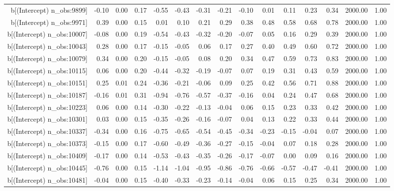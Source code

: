 \begin{table}[ht]
\begin{tabular}{rrrrrrrrrrrrrrr}
  b[(Intercept) n\_obs:9899] & -0.10 & 0.00 & 0.17 & -0.55 & -0.43 & -0.31 & -0.21 & -0.10 & 0.01 & 0.11 & 0.23 & 0.34 & 2000.00 & 1.00 \\ 
  b[(Intercept) n\_obs:9971] & 0.39 & 0.00 & 0.15 & 0.01 & 0.10 & 0.21 & 0.29 & 0.38 & 0.48 & 0.58 & 0.68 & 0.78 & 2000.00 & 1.00 \\ 
  b[(Intercept) n\_obs:10007] & -0.08 & 0.00 & 0.19 & -0.54 & -0.43 & -0.32 & -0.20 & -0.07 & 0.05 & 0.16 & 0.29 & 0.39 & 2000.00 & 1.00 \\ 
  b[(Intercept) n\_obs:10043] & 0.28 & 0.00 & 0.17 & -0.15 & -0.05 & 0.06 & 0.17 & 0.27 & 0.40 & 0.49 & 0.60 & 0.72 & 2000.00 & 1.00 \\ 
  b[(Intercept) n\_obs:10079] & 0.34 & 0.00 & 0.20 & -0.15 & -0.05 & 0.08 & 0.20 & 0.34 & 0.47 & 0.59 & 0.73 & 0.83 & 2000.00 & 1.00 \\ 
  b[(Intercept) n\_obs:10115] & 0.06 & 0.00 & 0.20 & -0.44 & -0.32 & -0.19 & -0.07 & 0.07 & 0.19 & 0.31 & 0.43 & 0.59 & 2000.00 & 1.00 \\ 
  b[(Intercept) n\_obs:10151] & 0.25 & 0.01 & 0.24 & -0.36 & -0.21 & -0.06 & 0.09 & 0.25 & 0.42 & 0.56 & 0.71 & 0.88 & 2000.00 & 1.00 \\ 
  b[(Intercept) n\_obs:10187] & -0.16 & 0.01 & 0.31 & -0.94 & -0.76 & -0.57 & -0.37 & -0.16 & 0.04 & 0.24 & 0.47 & 0.68 & 2000.00 & 1.00 \\ 
  b[(Intercept) n\_obs:10223] & 0.06 & 0.00 & 0.14 & -0.30 & -0.22 & -0.13 & -0.04 & 0.06 & 0.15 & 0.23 & 0.33 & 0.42 & 2000.00 & 1.00 \\ 
  b[(Intercept) n\_obs:10301] & 0.03 & 0.00 & 0.15 & -0.35 & -0.26 & -0.16 & -0.07 & 0.04 & 0.13 & 0.22 & 0.33 & 0.44 & 2000.00 & 1.00 \\ 
  b[(Intercept) n\_obs:10337] & -0.34 & 0.00 & 0.16 & -0.75 & -0.65 & -0.54 & -0.45 & -0.34 & -0.23 & -0.15 & -0.04 & 0.07 & 2000.00 & 1.00 \\ 
  b[(Intercept) n\_obs:10373] & -0.15 & 0.00 & 0.17 & -0.60 & -0.49 & -0.36 & -0.27 & -0.15 & -0.04 & 0.07 & 0.18 & 0.28 & 2000.00 & 1.00 \\ 
  b[(Intercept) n\_obs:10409] & -0.17 & 0.00 & 0.14 & -0.53 & -0.43 & -0.35 & -0.26 & -0.17 & -0.07 & 0.00 & 0.09 & 0.16 & 2000.00 & 1.00 \\ 
  b[(Intercept) n\_obs:10445] & -0.76 & 0.00 & 0.15 & -1.14 & -1.04 & -0.95 & -0.86 & -0.76 & -0.66 & -0.57 & -0.47 & -0.41 & 2000.00 & 1.00 \\ 
  b[(Intercept) n\_obs:10481] & -0.04 & 0.00 & 0.15 & -0.40 & -0.33 & -0.23 & -0.14 & -0.04 & 0.06 & 0.15 & 0.25 & 0.34 & 2000.00 & 1.00 \\ 

\end{tabular}
\end{table}
